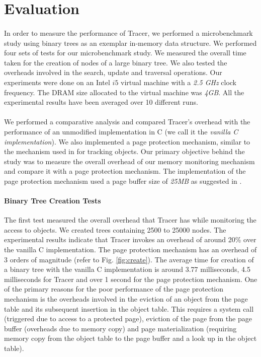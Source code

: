 \section{Evaluation}
\label{sec:eval}
\paragraph{}
In order to measure the performance of Tracer, we performed a microbenchmark study using binary trees as an exemplar in-memory data structure. We performed four sets of tests for our microbenchmark study. We measured the overall time taken for the creation of nodes of a large binary tree. We also tested the overheads involved in the search, update and traversal operations. Our experiments were done on an Intel $i5$ virtual machine with a {\emph{2.5 GHz}} clock frequency. The DRAM size allocated to the virtual machine was {\emph{4GB}}. All the experimental results have been averaged over 10 different runs. 

\paragraph{}
We performed a comparative analysis and compared Tracer's overhead with the performance of an unmodified implementation in C (we call it the {\emph{vanilla C implementation}}). We also implemented a page protection mechanism, similar to the mechanism used in \cite{SSDAlloc} for tracking objects. Our primary objective behind the study was to measure the overall overhead of our memory monitoring mechanism and compare it with a page protection mechanism. The implementation of the page protection mechanism used a page buffer size of {\emph{25MB}} as suggested in \cite{SSDAlloc}.

\paragraph{Binary Tree Creation Tests}
The first test measured the overall overhead that Tracer has while monitoring the access to objects. We created trees containing 2500 to 25000 nodes. The experimental results indicate that Tracer invokes an overhead of around 20\% over the vanilla C implementation. The page protection mechanism has an overhead of 3 orders of magnitude (refer to Fig. \ref{fig:create}). The average time for creation of a binary tree with the vanilla C implementation is around 3.77 milliseconds, 4.5 milliseconds for Tracer and over 1 second for the page protection mechanism. One of the primary reasons for the poor performance of the page protection mechanism is the overheads involved in the eviction of an object from the page table and its subsequent insertion in the object table. This requires a system call (triggered due to access to a protected page), eviction of the page from the page buffer (overheads due to memory copy) and page materialization (requiring memory copy from the object table to the page buffer and a look up in the object table). 

